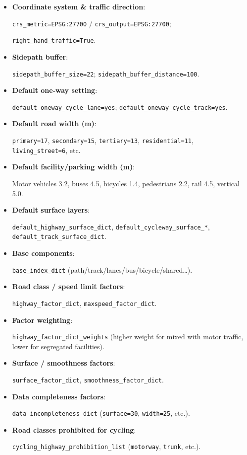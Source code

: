 \documentclass[
  12pt,
  oneside]{book}
\begin{document}

\begin{itemize}
\item
  \textbf{Coordinate system \& traffic direction}:

  \texttt{crs\_metric=\textquotesingle{}EPSG:27700\textquotesingle{}} / \texttt{crs\_output=\textquotesingle{}EPSG:27700\textquotesingle{}};

  \texttt{right\_hand\_traffic=True}.
\item
  \textbf{Sidepath buffer}:

  \texttt{sidepath\_buffer\_size=22}; \texttt{sidepath\_buffer\_distance=100}.
\item
  \textbf{Default one-way setting}:

  \texttt{default\_oneway\_cycle\_lane=\textquotesingle{}yes\textquotesingle{}}; \texttt{default\_oneway\_cycle\_track=\textquotesingle{}yes\textquotesingle{}}.
\item
  \textbf{Default road width (m)}:

  \texttt{primary=17}, \texttt{secondary=15}, \texttt{tertiary=13}, \texttt{residential=11}, \texttt{living\_street=6}, etc.
\item
  \textbf{Default facility/parking width (m)}:

  Motor vehicles 3.2, buses 4.5, bicycles 1.4, pedestrians 2.2, rail 4.5, vertical 5.0.
\item
  \textbf{Default surface layers}:

  \texttt{default\_highway\_surface\_dict}, \texttt{default\_cycleway\_surface\_*}, \texttt{default\_track\_surface\_dict}.
\item
  \textbf{Base components}:

  \texttt{base\_index\_dict} (path/track/lanes/bus/bicycle/shared\ldots).
\item
  \textbf{Road class / speed limit factors}:

  \texttt{highway\_factor\_dict}, \texttt{maxspeed\_factor\_dict}.
\item
  \textbf{Factor weighting}:

  \texttt{highway\_factor\_dict\_weights} (higher weight for mixed with motor traffic, lower for segregated facilities).
\item
  \textbf{Surface / smoothness factors}:

  \texttt{surface\_factor\_dict}, \texttt{smoothness\_factor\_dict}.
\item
  \textbf{Data completeness factors}:

  \texttt{data\_incompleteness\_dict} (\texttt{surface=30}, \texttt{width=25}, etc.).
\item
  \textbf{Road classes prohibited for cycling}:

  \texttt{cycling\_highway\_prohibition\_list} (\texttt{motorway}, \texttt{trunk}, etc.).
\end{itemize}
\end{document}
